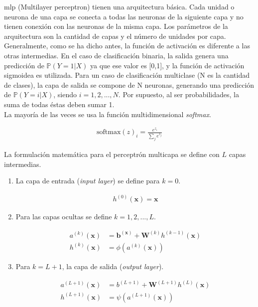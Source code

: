 \indent \acrshort{mlp} (Multilayer perceptron) tienen una arquitectura básica. Cada unidad o neurona de una capa se
conecta a todas las neuronas de la siguiente capa y no tienen conexión con las neuronas de la misma capa. Los
parámetros de la arquitectura son la cantidad de capas y el número de unidades por capa. Generalmente, como se ha
dicho antes, la función de activación es diferente a las otras intermedias. En el caso de clasificación binaria, la
salida genera una predicción de $\mathbb{P}(Y=1|X)$ ya que ese valor es [0,1], y la función de activación sigmoidea
es utilizada. Para un caso de clasificación multiclase (N es la cantidad de clases), la capa de salida se compone de
N neuronas, generando una predicción de $\mathbb{P}(Y=i|X)$, siendo $i=1,2,...,N$. Por supuesto, al ser
probabilidades, la suma de todas éstas deben sumar 1. \\
\indent La mayoría de las veces se usa la función multidimensional \textit{softmax}.

\begin{align}
  \mathrm{softmax}(z)_i = \frac{e^{z_i}}{\sum_j e^{z_j}}
\end{align}

\indent La formulación matemática para el perceptrón multicapa se define con $L$ capas intermedias.

\begin{enumerate}
  \item La capa de entrada (\textit{input layer}) se define para $k=0$.

  \begin{align*}
    h^{(0)}(\bm{x}) = \bm{x}
  \end{align*}

  \item Para las capas ocultas se define $k = 1,2,...,L$.

  \begin{align*}
    a^{(k)}(\bm{x}) &= \bm{b}^{(\bm{x})} + \mathbf{W}^{(k)}h^{(k-1)}(\mathbf{x}) \\
    h^{(k)}(\bm{x}) &= \phi(a^{(k)}(\bm{x}))
  \end{align*}

  \item Para $k = L+1$, la capa de salida (\textit{output layer}).

  \begin{align*}
    a^{(L+1)}(\bm{x}) &= b^{(L+1)} + \mathbf{W}^{(L+1)}h^{(L)}(\mathbf{x}) \\
    h^{(L+1)}(\bm{x}) &= \psi(a^{(L+1)}(\bm{x}))
  \end{align*}
\end{enumerate}

